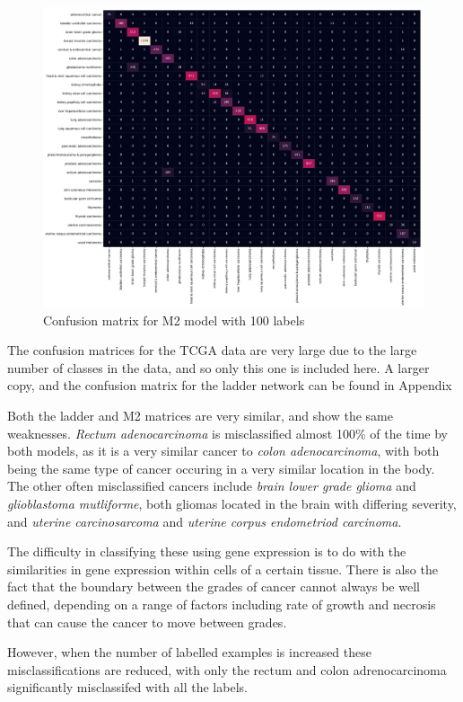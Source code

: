 \begin{figure}[H]
  \centering
  \includegraphics[scale=0.35]{figs/m2_tcga_minmax_m2_100.pdf}
  \caption{Confusion matrix for M2 model with 100 labels}
\end{figure}

The confusion matrices for the TCGA data are very large due to the large number of classes in the data, and so only this one is included
here. A larger copy, and the confusion matrix for the ladder network can be found in Appendix

Both the ladder and M2 matrices are very similar, and show the same weaknesses. \textit{Rectum adenocarcinoma} 
is misclassified almost 
100\% of the time by both models, as it is a very similar cancer to \textit{colon adenocarcinoma}, with both being the same type of cancer
occuring in a very similar location in the body. The other often misclassified cancers include \textit{brain lower grade glioma} and 
\textit{glioblastoma mutliforme}, both gliomas located in the brain with differing severity, and \textit{uterine carcinosarcoma} and 
\textit{uterine corpus endometriod carcinoma}. 

The difficulty in classifying these using gene expression is to do with the similarities in gene expression within cells of a certain tissue.
There is also the fact that the boundary between the grades of cancer cannot always be well defined, depending on a range of factors 
including rate of growth and necrosis that can cause the cancer to move between grades.

However, when the number of labelled examples is increased these misclassifications are reduced, with only the rectum and colon adrenocarcinoma 
significantly misclassifed with all the labels.

